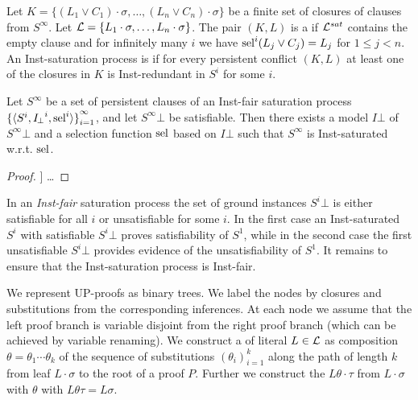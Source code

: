 \begin{definition}
    Let
    \( K = \{ (L_1\lor C_1)\cdot\sigma, \ldots, (L_n\lor C_n)\cdot\sigma \} \)
    be a finite set of closures
    of clauses from \( S^\infty \).
    Let \( \mathcal{L} = \{ L_1\cdot\sigma, \ldots, L_n\cdot\sigma \} \).
    The pair \( (K,L) \) is a  if
    \( \mathcal{L}^{sat} \) contains the empty clause
    and for infinitely many \( i \)
    we have \( \operatorname{sel}^i(L_j\lor C_j) = L_j \)
    for \( 1\leq j < n \).
    An Inst-saturation process is 
    if for every persistent conflict
    \( (K,L) \)
    at least one of the closures in \( K \)
    is Inst-redundant in \( S^i \) for some \( i \).
    \end{definition}

    \begin{lemma}
        Let \( S^\infty \) be a set of persistent clauses
        of an Inst-fair saturation process
        \( {\{ \langle S^i, {I\!_\bot}^i, \operatorname{sel}^i \rangle \}}_{i=1}^\infty \),
        and let \( S^\infty \! \bot \) be satisfiable.
        Then there exists a model \( I \! \bot \) of \( S^\infty \! \bot \)
        and a selection function \( \operatorname{sel} \) based on \( I \! \bot \)
        such that \(S^\infty \) is Inst-saturated w.r.t. \( \operatorname{sel} \).
    \end{lemma}

    \begin{proof}\cite{GK2004csl}] …
    \end{proof}


        In an \emph{Inst-fair} saturation process
        the set of ground instances
        \( S^i \! \bot \) is either satisfiable for all \( i \)
        or unsatisfiable for some \( i \).
        In the first case an Inst-saturated \( S^i \)
        with satisfiable \( S^i \! \bot \) proves satisfiability of \( S^1 \),
        while in the second case the first unsatisfiable \( S^i \! \bot \)
        provides evidence of the unsatisfiability of \( S^1 \).
%
    It remains to ensure that the Inst-saturation process is Inst-fair.


    We represent UP-proofs as binary trees.
    We label the nodes by closures
    and substitutions from the corresponding inferences.
    At each node we assume that the left proof branch
    is variable disjoint from the right proof branch
    (which can be achieved by variable renaming).
    We construct a 
    of literal \( L \in \mathcal{L} \)
    as composition \( \theta = \theta_1\cdots\theta_k \)
    of the sequence of substitutions \( {(\theta_i)}_{i=1}^k \)
    along the path of length \( k \)
    from leaf \( L\cdot\sigma \)
    to the root of a proof \( P \).
    Further we construct the 
    \( L\theta\cdot\tau \) from
    \( L \cdot \sigma \) with \( \theta \)
    with \( L\theta\tau = L\sigma \).


